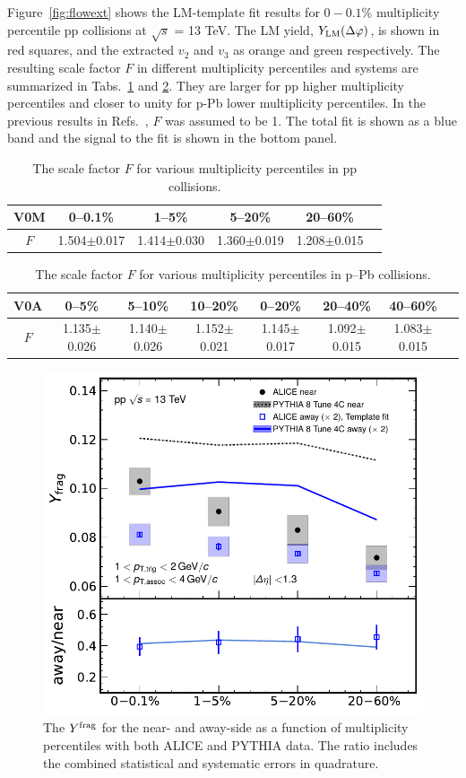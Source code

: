 Figure~\ref{fig:flowext} shows the LM-template fit results for $0-0.1\%$ multiplicity percentile pp collisions at $\sqrt{s}$ = 13 TeV. The LM yield,  $Y_{\rm{LM}}(\Delta\varphi)$, is shown in red squares, and the extracted $v_{2}$ and $v_{3}$ as orange and green respectively. The resulting scale factor $F$ in different multiplicity percentiles and systems are summarized in Tabs.~\ref{tab:Fpp} and \ref{tab:Fpb}. They are larger for pp higher multiplicity percentiles and closer to unity for p-Pb lower multiplicity percentiles. In the previous results in Refs.~\cite{ALICE:2012eyl, ALICE:2013snk}, $F$ was assumed to be 1. The total fit is shown as a blue band and the signal to the fit is shown in the bottom panel. 
\begin{table}[h!]
\caption{The scale factor $F$ for various multiplicity percentiles in pp collisions.}
\centering
\begin{tabular}{|c|cccc|c}
\hline
 V0M& 0--0.1\% & 1--5\% & 5--20\% & 20--60\% \\ 
 \hline
 $F$ & 1.504$\pm$0.017 & 1.414$\pm$0.030 & 1.360$\pm$0.019 & 1.208$\pm$0.015 \\  
 \hline
 \end{tabular}
 \label{tab:Fpp}
 
\end{table}

\begin{table}[h!]
\caption{The scale factor $F$ for various multiplicity percentiles in p--Pb collisions.}
\centering
\begin{tabular}{|c|cccccc|c}
 \hline
 V0A& 0--5\% & 5--10\% & 10--20\% & 0--20\% & 20--40\% & 40--60\% \\ 
 \hline
 $F$& 1.135$\pm$0.026 & 1.140$\pm$0.026 & 1.152$\pm$0.021 & 1.145$\pm$0.017 &1.092$\pm$0.015 & 1.083$\pm$0.015 \\  
 \hline
\end{tabular}
\label{tab:Fpb}
\end{table}

\begin{figure}[h!]
	\centering
	\includegraphics[width=0.6 \textwidth]{figures/Fig5_Plot_v2Mult.pdf} 
	\caption{The $Y^{\rm{frag}}$ for the near- and away-side as a function of multiplicity percentiles with both ALICE and PYTHIA data. The ratio includes the combined statistical and systematic errors in quadrature.}
	\label{fig:Ymult}
\end{figure}

